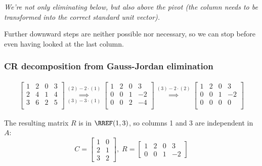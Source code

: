 \textit{We're not only eliminating below, but also above the pivot (the column needs to be transformed into the correct standard unit vector).}

Further downward steps are neither
possible nor necessary, so we can stop before even having looked at the last
column.

\subsubsection{CR decomposition from Gauss-Jordan elimination}
\begin{align*}
    \begin{bmatrix}
        1 & 2 & 0 & 3 \\
        2 & 4 & 1 & 4 \\
        3 & 6 & 2 & 5 \\
    \end{bmatrix}
    \overset{(2)-2\cdot(1)}{\underset{(3)-3\cdot(1)}{\implies}}
    \begin{bmatrix}
        1 & 2 & 0 & 3 \\
        0 & 0 & 1 & -2 \\
        0 & 0 & 2 & -4 \\
    \end{bmatrix}
    \stackrel{(3)-2\cdot(2)}{\implies}
    \begin{bmatrix}
        1 & 2 & 0 & 3 \\
        0 & 0 & 1 & -2 \\
        0 & 0 & 0 & 0 \\
    \end{bmatrix}
\end{align*}

The resulting matrix $R$ is in $\RREF(1,3)$, so columns
1 and 3 are independent in $A$:
$$C=
\begin{bmatrix}
    1 & 0 \\
    2 & 1 \\
    3 & 2
\end{bmatrix},\;
R=
\begin{bmatrix}
    1 & 2 & 0 & 3 \\
    0 & 0 & 1 & -2
\end{bmatrix}$$

